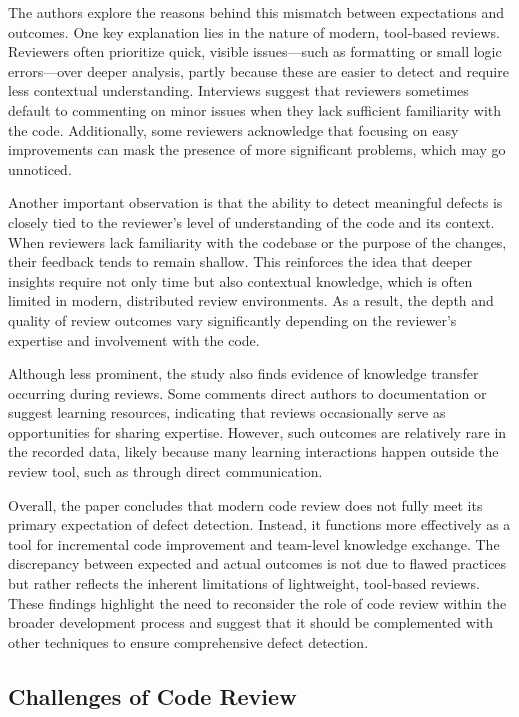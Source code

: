 The authors explore the reasons behind this mismatch between expectations and outcomes. One key explanation lies in the nature of modern, tool-based reviews. Reviewers often prioritize quick, visible issues—such as formatting or small logic errors—over deeper analysis, partly because these are easier to detect and require less contextual understanding. Interviews suggest that reviewers sometimes default to commenting on minor issues when they lack sufficient familiarity with the code. Additionally, some reviewers acknowledge that focusing on easy improvements can mask the presence of more significant problems, which may go unnoticed.

Another important observation is that the ability to detect meaningful defects is closely tied to the reviewer’s level of understanding of the code and its context. When reviewers lack familiarity with the codebase or the purpose of the changes, their feedback tends to remain shallow. This reinforces the idea that deeper insights require not only time but also contextual knowledge, which is often limited in modern, distributed review environments. As a result, the depth and quality of review outcomes vary significantly depending on the reviewer’s expertise and involvement with the code.

Although less prominent, the study also finds evidence of knowledge transfer occurring during reviews. Some comments direct authors to documentation or suggest learning resources, indicating that reviews occasionally serve as opportunities for sharing expertise. However, such outcomes are relatively rare in the recorded data, likely because many learning interactions happen outside the review tool, such as through direct communication.

Overall, the paper concludes that modern code review does not fully meet its primary expectation of defect detection. Instead, it functions more effectively as a tool for incremental code improvement and team-level knowledge exchange. The discrepancy between expected and actual outcomes is not due to flawed practices but rather reflects the inherent limitations of lightweight, tool-based reviews. These findings highlight the need to reconsider the role of code review within the broader development process and suggest that it should be complemented with other techniques to ensure comprehensive defect detection.

\subsection{Challenges of Code Review}
